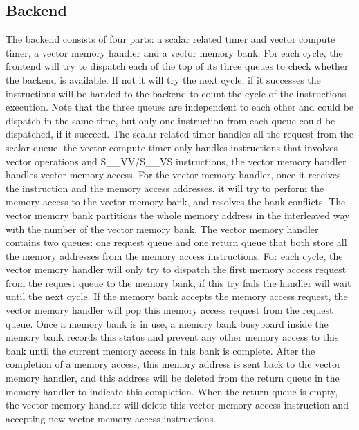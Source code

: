 \documentclass[conference]{IEEEtran}
\begin{document}
\subsection{Backend}
The backend consists of four parts: a scalar related timer and vector compute timer, a vector memory handler and a vector memory bank. For each cycle, the frontend will try to dispatch each of the top of its three queues to check whether the backend is available. If not it will try the next cycle, if it successes the instructions will be handed to the backend to count the cycle of the instructions execution. Note that the three queues are independent to each other and could be dispatch in the same time, but only one instruction from each queue could be dispatched, if it succeed. The scalar related timer handles all the request from the scalar queue, the vector compute timer only handles instructions that involves vector operations and S\_\_VV/S\_\_VS instructions, the vector memory handler handles vector memory access. For the vector memory handler, once it receives the instruction and the memory access addresses, it will try to perform the memory access to the vector memory bank, and resolves the bank conflicts. The vector memory bank partitions the whole memory address in the interleaved way with the number of the vector memory bank. The vector memory handler contains two queues: one request queue and one return queue that both store all the memory addresses from the memory access instructions. For each cycle, the vector memory handler will only try to dispatch the first memory access request from the request queue to the memory bank, if this try fails the handler will wait until the next cycle. If the memory bank accepts the memory access request, the vector memory handler will pop this memory access request from the request queue. Once a memory bank is in use, a memory bank busyboard inside the memory bank records this status and prevent any other memory access to this bank until the current memory access in this bank is complete. After the completion of a memory access, this memory address is sent back to the vector memory handler, and this address will be deleted from the return queue in the memory handler to indicate this completion. When the return queue is empty, the vector memory handler will delete this vector memory access instruction and accepting new vector memory access instructions.
\end{document}
